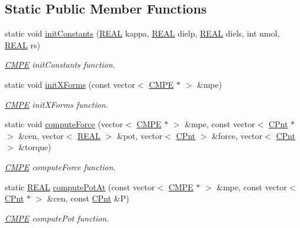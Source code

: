 \subsection*{Static Public Member Functions}
\begin{DoxyCompactItemize}
\item 
static void \hyperlink{classCMPE_accac27799cb676fb3160683583a8619e}{init\-Constants} (\hyperlink{util_8h_a5821460e95a0800cf9f24c38915cbbde}{R\-E\-A\-L} kappa, \hyperlink{util_8h_a5821460e95a0800cf9f24c38915cbbde}{R\-E\-A\-L} dielp, \hyperlink{util_8h_a5821460e95a0800cf9f24c38915cbbde}{R\-E\-A\-L} diels, int nmol, \hyperlink{util_8h_a5821460e95a0800cf9f24c38915cbbde}{R\-E\-A\-L} rs)
\begin{DoxyCompactList}\small\item\em \hyperlink{classCMPE}{C\-M\-P\-E} init\-Constants function. \end{DoxyCompactList}\item 
static void \hyperlink{classCMPE_a56b7e4c76e20d5e34393a72cc31f6bb3}{init\-X\-Forms} (const vector$<$ \hyperlink{classCMPE}{C\-M\-P\-E} $\ast$ $>$ \&mpe)
\begin{DoxyCompactList}\small\item\em \hyperlink{classCMPE}{C\-M\-P\-E} init\-X\-Forms function. \end{DoxyCompactList}\item 
static void \hyperlink{classCMPE_ab825df6d8ab377af3715b86e3a495e34}{compute\-Force} (vector$<$ \hyperlink{classCMPE}{C\-M\-P\-E} $\ast$ $>$ \&mpe, const vector$<$ \hyperlink{classCPnt}{C\-Pnt} $\ast$ $>$ \&cen, vector$<$ \hyperlink{util_8h_a5821460e95a0800cf9f24c38915cbbde}{R\-E\-A\-L} $>$ \&pot, vector$<$ \hyperlink{classCPnt}{C\-Pnt} $>$ \&force, vector$<$ \hyperlink{classCPnt}{C\-Pnt} $>$ \&torque)
\begin{DoxyCompactList}\small\item\em \hyperlink{classCMPE}{C\-M\-P\-E} compute\-Force function. \end{DoxyCompactList}\item 
static \hyperlink{util_8h_a5821460e95a0800cf9f24c38915cbbde}{R\-E\-A\-L} \hyperlink{classCMPE_a8a6b260459ff6af55260e2c7897f3bd0}{compute\-Pot\-At} (const vector$<$ \hyperlink{classCMPE}{C\-M\-P\-E} $\ast$ $>$ \&mpe, const vector$<$ \hyperlink{classCPnt}{C\-Pnt} $\ast$ $>$ \&cen, const \hyperlink{classCPnt}{C\-Pnt} \&P)
\begin{DoxyCompactList}\small\item\em \hyperlink{classCMPE}{C\-M\-P\-E} compute\-Pot function. \end{DoxyCompactList}\item 

\end{DoxyCompactItemize}
